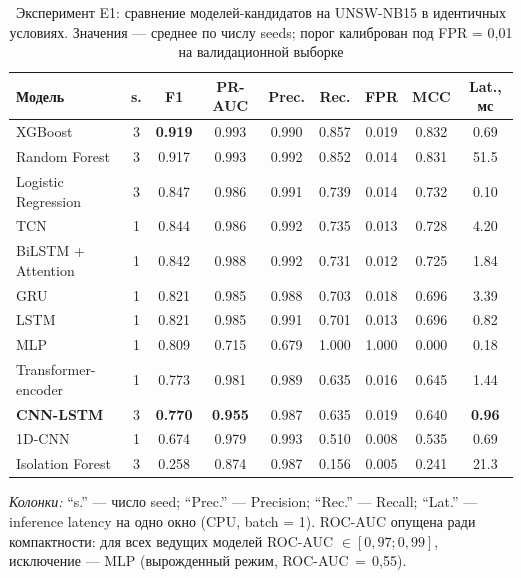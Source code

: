 \begin{table}[H]
\centering
\caption{Эксперимент E1: сравнение моделей-кандидатов на UNSW-NB15
в идентичных условиях. Значения --- среднее по числу seeds;
порог калиброван под FPR = 0{,}01 на валидационной выборке}
\label{tab:E1-summary}
\renewcommand{\arraystretch}{1.15}
\setlength{\tabcolsep}{4pt}
\small
\begin{tabular}{@{}lcccccccc@{}}
\toprule
\textbf{Модель} & \textbf{s.} & \textbf{F1} & \textbf{PR-AUC} &
\textbf{Prec.} & \textbf{Rec.} & \textbf{FPR} & \textbf{MCC} &
\textbf{Lat., мс} \\
\midrule
XGBoost              & 3 & \textbf{0.919} & 0.993 & 0.990 & 0.857 & 0.019 & 0.832 & 0.69  \\
Random Forest        & 3 & 0.917 & 0.993 & 0.992 & 0.852 & 0.014 & 0.831 & 51.5 \\
Logistic Regression  & 3 & 0.847 & 0.986 & 0.991 & 0.739 & 0.014 & 0.732 & 0.10 \\
TCN                  & 1 & 0.844 & 0.986 & 0.992 & 0.735 & 0.013 & 0.728 & 4.20 \\
BiLSTM + Attention   & 1 & 0.842 & 0.988 & 0.992 & 0.731 & 0.012 & 0.725 & 1.84 \\
GRU                  & 1 & 0.821 & 0.985 & 0.988 & 0.703 & 0.018 & 0.696 & 3.39 \\
LSTM                 & 1 & 0.821 & 0.985 & 0.991 & 0.701 & 0.013 & 0.696 & 0.82 \\
MLP                  & 1 & 0.809 & 0.715 & 0.679 & 1.000 & 1.000 & 0.000 & 0.18 \\
Transformer-encoder  & 1 & 0.773 & 0.981 & 0.989 & 0.635 & 0.016 & 0.645 & 1.44 \\
\textbf{CNN-LSTM}    & 3 & \textbf{0.770} & \textbf{0.955} & 0.987 & 0.635 & 0.019 & 0.640 & \textbf{0.96} \\
1D-CNN               & 1 & 0.674 & 0.979 & 0.993 & 0.510 & 0.008 & 0.535 & 0.69 \\
Isolation Forest     & 3 & 0.258 & 0.874 & 0.987 & 0.156 & 0.005 & 0.241 & 21.3 \\
\bottomrule
\end{tabular}

\smallskip
\footnotesize
\textit{Колонки:} ``s.'' --- число seed; ``Prec.'' --- Precision;
``Rec.'' --- Recall; ``Lat.'' --- inference latency на одно окно
(CPU, batch = 1). ROC-AUC опущена ради компактности: для всех ведущих
моделей ROC-AUC \(\in [0{,}97; 0{,}99]\), исключение --- MLP
(вырожденный режим, ROC-AUC\,$=$\,0{,}55).
\end{table}

